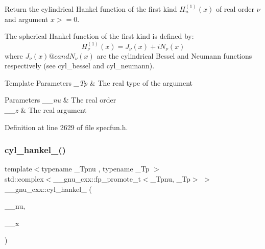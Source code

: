Return the cylindrical Hankel function of the first kind $ H^{(1)}_n(x) $ of real order $ \nu $ and argument $ x >= 0 $.

The spherical Hankel function of the first kind is defined by\+: \[ H^{(1)}_\nu(x) = J_\nu(x) + iN_\nu(x) \] where $ J_\nu(x) @c and N_\nu(x) $ are the cylindrical Bessel and Neumann functions respectively (see cyl\+\_\+bessel and cyl\+\_\+neumann).


\begin{DoxyTemplParams}{Template Parameters}
{\em \+\_\+\+Tp} & The real type of the argument \\
\hline
\end{DoxyTemplParams}

\begin{DoxyParams}{Parameters}
{\em \+\_\+\+\_\+nu} & The real order \\
\hline
{\em \+\_\+\+\_\+z} & The real argument \\
\hline
\end{DoxyParams}


Definition at line 2629 of file specfun.\+h.

\mbox{\label{group__mathsf__gnu_ga2f111212d3ec713625acb6986daa925f}} 
\subsubsection{\texorpdfstring{cyl\+\_\+hankel\+\_()}{cyl\_hankel\_1()}\hspace{0.1cm}{\footnotesize\ttfamily [2/2]}}
{\footnotesize\ttfamily template$<$typename \+\_\+\+Tpnu , typename \+\_\+\+Tp $>$ \\
std\+::complex$<$\+\_\+\+\_\+gnu\+\_\+cxx\+::fp\+\_\+promote\+\_\+t$<$\+\_\+\+Tpnu, \+\_\+\+Tp$>$ $>$ \+\_\+\+\_\+gnu\+\_\+cxx\+::cyl\+\_\+hankel\+\_ (\begin{DoxyParamCaption}\item[{std\+::complex$<$ \+\_\+\+Tpnu $>$}]{\+\_\+\+\_\+nu,  }\item[{std\+::complex$<$ \+\_\+\+Tp $>$}]{\+\_\+\+\_\+x }\end{DoxyParamCaption})\hspace{0.3cm}{\ttfamily [inline]}}

